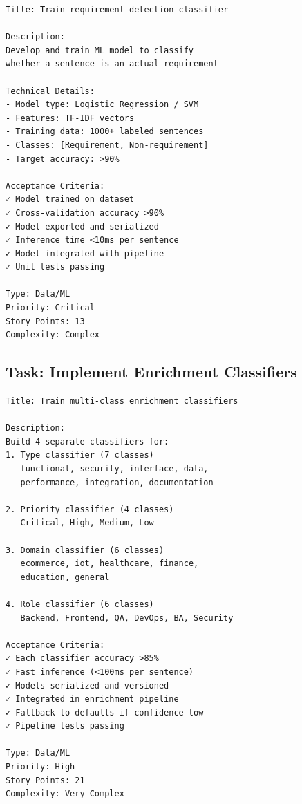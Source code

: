 \documentclass[12pt, a4paper]{report}
\begin{document}
\begin{tcolorbox}[colback=red!5]
\begin{lstlisting}
Title: Train requirement detection classifier

Description:
Develop and train ML model to classify
whether a sentence is an actual requirement

Technical Details:
- Model type: Logistic Regression / SVM
- Features: TF-IDF vectors
- Training data: 1000+ labeled sentences
- Classes: [Requirement, Non-requirement]
- Target accuracy: >90%

Acceptance Criteria:
✓ Model trained on dataset
✓ Cross-validation accuracy >90%
✓ Model exported and serialized
✓ Inference time <10ms per sentence
✓ Model integrated with pipeline
✓ Unit tests passing

Type: Data/ML
Priority: Critical
Story Points: 13
Complexity: Complex
\end{lstlisting}
\end{tcolorbox}

\subsection{Task: Implement Enrichment Classifiers}

\begin{tcolorbox}[colback=magenta!5]
\begin{lstlisting}
Title: Train multi-class enrichment classifiers

Description:
Build 4 separate classifiers for:
1. Type classifier (7 classes)
   functional, security, interface, data, 
   performance, integration, documentation
   
2. Priority classifier (4 classes)
   Critical, High, Medium, Low
   
3. Domain classifier (6 classes)
   ecommerce, iot, healthcare, finance, 
   education, general
   
4. Role classifier (6 classes)
   Backend, Frontend, QA, DevOps, BA, Security

Acceptance Criteria:
✓ Each classifier accuracy >85%
✓ Fast inference (<100ms per sentence)
✓ Models serialized and versioned
✓ Integrated in enrichment pipeline
✓ Fallback to defaults if confidence low
✓ Pipeline tests passing

Type: Data/ML
Priority: High
Story Points: 21
Complexity: Very Complex
\end{lstlisting}
\end{tcolorbox}
\end{document}
